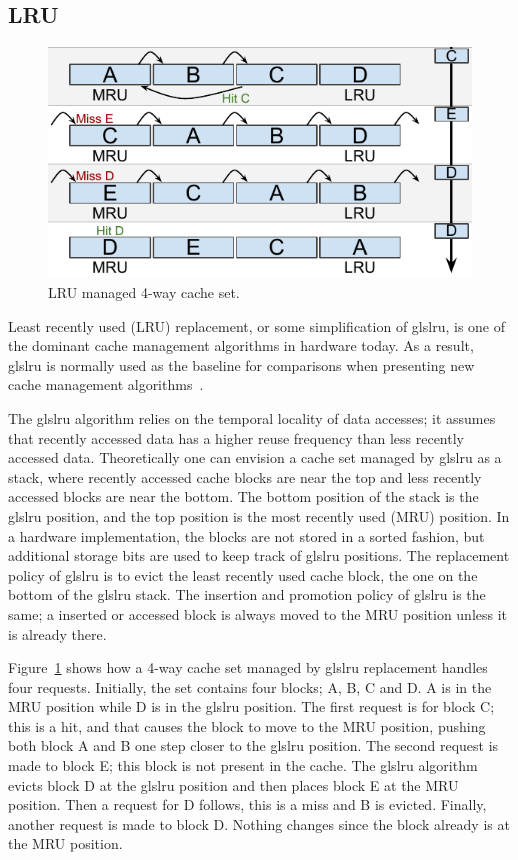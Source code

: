 
\subsection{LRU}
\label{sec:algorithms:lru}

\begin{figure}[ht]
    \centering
    \includegraphics[width=.65\textwidth]{figures/algorithms/LRU}
    \caption{LRU managed 4-way cache set.}
    \label{fig:algorithms:lru_example}
\end{figure}

\noindent
Least recently used (LRU) replacement, or some simplification of gls{lru}, is one of the dominant cache management algorithms in hardware today. 
As a result, gls{lru} is normally used as the baseline for comparisons when presenting new cache management algorithms~\cite{Jaleel2010,Qureshi2006,Qureshi2007}.

The gls{lru} algorithm relies on the temporal locality of data accesses; it assumes that recently accessed data has a higher reuse frequency than less recently accessed data.
Theoretically one can envision a cache set managed by gls{lru} as a stack, where recently accessed cache blocks are near the top and less recently accessed blocks are near the bottom.
The bottom position of the stack is the gls{lru} position, and the top position is the most recently used (MRU) position.
In a hardware implementation, the blocks are not stored in a sorted fashion, but additional storage bits are used to keep track of gls{lru} positions.
The replacement policy of gls{lru} is to evict the least recently used cache block, the one on the bottom of the gls{lru} stack.
The insertion and promotion policy of gls{lru} is the same; a inserted or accessed block is always moved to the MRU position unless it is already there.

Figure~\ref{fig:algorithms:lru_example} shows how a 4-way cache set managed by gls{lru} replacement handles four requests. 
Initially, the set contains four blocks; A, B, C and D. 
A is in the MRU position while D is in the gls{lru} position.
The first request is for block C; this is a hit, and that causes the block to move to the MRU position, pushing both block A and B one step closer to the gls{lru} position.
The second request is made to block E; this block is not present in the cache.
The gls{lru} algorithm evicts block D at the gls{lru} position and then places block E at the MRU position.
Then a request for D follows, this is a miss and B is evicted.
Finally, another request is made to block D. Nothing changes since the block already is at the MRU position.

